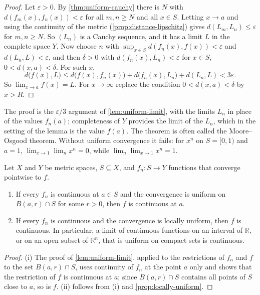 \begin{proof}
Let $\varepsilon>0$. By \cref{thm:uniform-cauchy} there is $N$ with $d(f_m(x),f_n(x))<\varepsilon$ for all $m,n\ge N$ and all $x\in S$. Letting $x\to a$ and using the continuity of the metric (\cref{prop:distance-lipschitz}) gives $d(L_m,L_n)\le\varepsilon$ for $m,n\ge N$. So $(L_n)$ is a Cauchy sequence, and it has a limit $L$ in the complete space $Y$. Now choose $n$ with $\sup_{x\in S}d(f_n(x),f(x))<\varepsilon$ and $d(L_n,L)<\varepsilon$, and then $\delta>0$ with $d(f_n(x),L_n)<\varepsilon$ for $x\in S$, $0<d(x,a)<\delta$. For such $x$,
\[
d\bigl(f(x),L\bigr)\le d\bigl(f(x),f_n(x)\bigr)+d\bigl(f_n(x),L_n\bigr)+d(L_n,L)<3\varepsilon .
\]
So $\lim_{x\to a}f(x)=L$. For $x\to\infty$ replace the condition $0<d(x,a)<\delta$ by $x>R$.
\end{proof}

The proof is the $\varepsilon/3$ argument of \cref{lem:uniform-limit}, with the limits $L_n$ in place of the values $f_n(a)$; completeness of $Y$ provides the limit of the $L_n$, which in the setting of the lemma is the value $f(a)$. The theorem is often called the Moore--Osgood theorem. Without uniform convergence it fails: for $x^n$ on $S=[0,1)$ and $a=1$, $\lim_{x\to1}\lim_nx^n=0$, while $\lim_n\lim_{x\to1}x^n=1$.

\begin{corollary}
\label{cor:limit-continuous}
Let $X$ and $Y$ be metric spaces, $S\subseteq X$, and $f_n\colon S\to Y$ functions that converge pointwise to $f$.
\begin{enumerate}
\item If every $f_n$ is continuous at $a\in S$ and the convergence is uniform on $B(a,r)\cap S$ for some $r>0$, then $f$ is continuous at $a$.
\item If every $f_n$ is continuous and the convergence is locally uniform, then $f$ is continuous. In particular, a limit of continuous functions on an interval of $\mathbb R$, or on an open subset of $\mathbb R^n$, that is uniform on compact sets is continuous.
\end{enumerate}
\end{corollary}

\begin{proof}
(i) The proof of \cref{lem:uniform-limit}, applied to the restrictions of $f_n$ and $f$ to the set $B(a,r)\cap S$, uses continuity of $f_n$ at the point $a$ only and shows that the restriction of $f$ is continuous at $a$; since $B(a,r)\cap S$ contains all points of $S$ close to $a$, so is $f$. (ii) follows from (i) and \cref{prop:locally-uniform}.
\end{proof}

